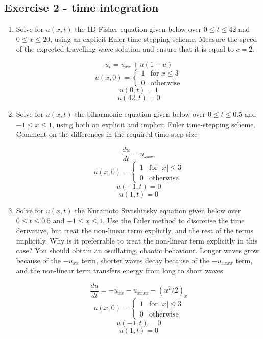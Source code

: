\documentclass[a4paper]{article}
\begin{document}
\subsection*{Exercise 2 - time integration}

\begin{enumerate}[label=\alph*.]
  \item Solve for $u(x, t)$ the 1D Fisher equation given below over $0 \le t \le 42$ and $0 \le x \le
  20$, using an explicit Euler time-stepping
  scheme. Measure the speed of the expected travelling wave solution and ensure that it
    is equal to $c=2$.

    $$ u_t = u_{xx} + u (1-u)$$
    $$ u(x,0) = \begin{cases} 
                    1 & \text{for } x \le 3 \\ 
                    0 & \text{otherwise}
                \end{cases}
    $$
    $$u(0, t) = 1$$
    $$u(42, t) = 0$$


  \item Solve for $u(x,t)$ the biharmonic equation given below over $0 \le t \le 0.5$ and
    $-1 \le x \le 1$, using both an explicit and implicit Euler time-stepping scheme.
    Comment on the differences in the required time-step size

    $$\frac{du}{dt} = u_{xxxx}$$
    $$ u(x,0) = \begin{cases} 
                    1 & \text{for } |x| \le 3 \\ 
                    0 & \text{otherwise}
                \end{cases}
    $$
    $$u(-1, t) = 0$$
    $$u(1, t) = 0$$

  \item Solve for $u(x,t)$ the Kuramoto Sivashinsky equation given below over $0 \le t
    \le 0.5$ and $-1 \le x \le 1$. Use the Euler method to discretise the time
    derivative, but treat the non-linear term explictly, and the rest of the terms
    implicitly. Why is it preferrable to treat the non-linear term explicitly in this
    case? You should obtain an oscillating, chaotic behaviour. Longer waves grow because
    of the $-u_{xx}$ term, shorter waves decay because of the $-u_{xxxx}$ term, and the
    non-linear term transfers energy from long to short waves.

    $$\frac{du}{dt} = -u_{xx} - u_{xxxx} - (u^2/2)_x$$
    $$ u(x,0) = \begin{cases} 
                    1 & \text{for } |x| \le 3 \\ 
                    0 & \text{otherwise}
                \end{cases}
    $$
    $$u(-1, t) = 0$$
    $$u(1, t) = 0$$
\end{enumerate}

 
\end{document}
